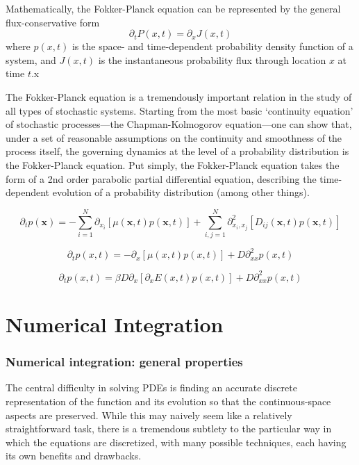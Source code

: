 \documentclass[15pt]{article}
\newcommand{\bs}[1]{\boldsymbol{#1}}
\begin{document}
Mathematically, the Fokker-Planck equation can be represented by the general flux-conservative form
\begin{equation}
    \partial_t P(x, t) = \partial_x J(x, t)
\end{equation}
where $p(x, t)$ is the space- and time-dependent probability density function of a system, and $J(x, t)$ is the instantaneous probability flux through location $x$ at time $t$.x


The Fokker-Planck equation is a tremendously important relation in the study of all types of stochastic systems. Starting from the most basic `continuity equation' of stochastic processes---the Chapman-Kolmogorov equation---one can show that, under a set of reasonable assumptions on the continuity and smoothness of the process itself, the governing dynamics at the level of a probability distribution is the Fokker-Planck equation.  Put simply, the Fokker-Planck equation takes the form of a 2nd order parabolic partial differential equation, describing the time-dependent evolution of a probability distribution (among other things).


\begin{equation}
    \partial_t p(\bs{x}) = -\sum_{i=1}^{N}\partial_{x_i}\left[ \mu(\bs{x}, t) p(\bs{x}, t) \right] + \sum_{i,j = 1}^N \partial_{x_i, x_j}^2 \left[ D_{ij}(\bs{x}, t) p(\bs{x}, t) \right] \label{eq:fokker-planck-general}
\end{equation}

\begin{equation}
    \partial_t p(x, t) = -\partial_x \left[ \mu(x, t)p(x, t) \right] + D\partial_{xx}^2p(x, t) \label{eq:fokker-planck-1D}
\end{equation}

\begin{equation}
    \partial_t p(x, t) = \beta D \partial_x\left[ \partial_x E(x, t) p(x, t) \right] + D\partial_{xx}^2 p(x, t) \label{eq:smoluchowski}
\end{equation}

\part{Numerical Integration}


\section{Numerical integration: general properties}
The central difficulty in solving PDEs is finding an accurate discrete representation of the function and its evolution so that the continuous-space aspects are preserved.  While this may naively seem like a relatively straightforward task, there is a tremendous subtlety to the particular way in which the equations are discretized, with many possible techniques, each having its own benefits and drawbacks.
\end{document}
